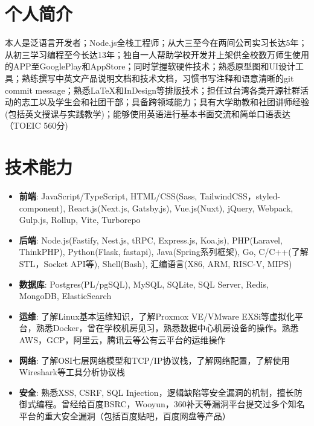 \documentclass{resume}
\newcommand{\iconsection}[2]{
    \section[\texorpdfstring{#2}{#2}]{\faIcon{#1}\quad #2}
}
\begin{document}
    \sloppy



    \iconsection{user}{个人简介}
    本人是泛语言开发者；Node.js全栈工程师；从大三至今在两间公司实习长达5年；从初三学习编程至今长达13年；独自一人帮助学校开发并上架供全校数万师生使用的APP至GooglePlay和AppStore；同时掌握软硬件技术；熟悉原型图和UI设计工具；熟练撰写中英文产品说明文档和技术文档，习惯书写注释和语意清晰的git commit message；熟悉\LaTeX 和InDesign等排版技术；担任过台湾各类开源社群活动的志工以及学生会和社团干部；具备跨领域能力；具有大学助教和社团讲师经验(包括英文授课与实践教学)；能够使用英语进行基本书面交流和简单口语表达（TOEIC 560分)

    \iconsection{wrench}{技术能力}
    \begin{itemize}
        \item \textbf{前端}: JavaScript/TypeScript, HTML/CSS(Sass, TailwindCSS，styled-component), React.js(Next.js, Gatsby,js), Vue.js(Nuxt), jQuery, Webpack, Gulp.js, Rollup, Vite, Turborepo
        \item \textbf{后端}: Node.js(Fastify, Nest.js, tRPC, Express.js, Koa.js), PHP(Laravel, ThinkPHP), Python(Flask, fastapi), Java(Spring系列框架), Go, C/C++(了解STL，Socket API等), Shell(Bash), 汇编语言(X86, ARM, RISC-V, MIPS)
        \item \textbf{数据库}: Postgres(PL/pgSQL), MySQL, SQLite, SQL Server, Redis, MongoDB, ElasticSearch
        \item \textbf{运维}: 了解Linux基本运维知识，了解Proxmox VE/VMware EXSi等虚拟化平台，熟悉Docker，曾在学校机房见习，熟悉数据中心机房设备的操作。熟悉AWS，GCP，阿里云，腾讯云等公有云平台的运维操作
        \item \textbf{网络}: 了解OSI七层网络模型和TCP/IP协议栈，了解网络配置，了解使用Wireshark等工具分析协议栈
        \item \textbf{安全}: 熟悉XSS, CSRF, SQL Injection，逻辑缺陷等安全漏洞的机制，擅长防御式编程。曾经给百度BSRC，Wooyun，360补天等漏洞平台提交过多个知名平台的重大安全漏洞（包括百度贴吧，百度网盘等产品）
    \end{itemize}
\end{document}
